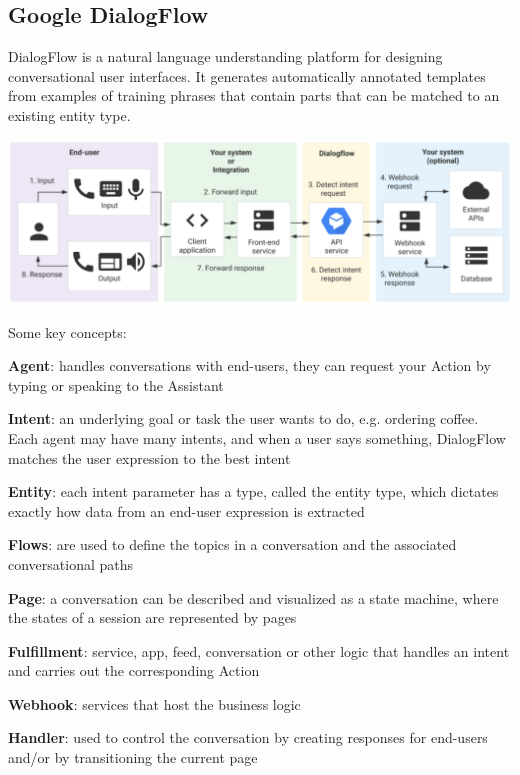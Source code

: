 \documentclass[10pt]{report}
\begin{document}
\subsection{Google DialogFlow} DialogFlow is a natural language understanding platform for designing conversational user interfaces. It generates automatically annotated templates from examples of training phrases that contain parts that can be matched to an existing entity type.
\begin{center}
	\includegraphics[scale=0.5]{138.png}
\end{center}
Some key concepts:
\begin{list}{}{}
	\item \textbf{Agent}: handles conversations with end-users, they can request your Action by typing or speaking to the Assistant
	\item \textbf{Intent}: an underlying goal or task the user wants to do, e.g. ordering coffee. Each agent may have many intents, and when a user says something, DialogFlow matches the user expression to the best intent
	\item \textbf{Entity}: each intent parameter has a type, called the entity type, which dictates exactly how data from an end-user expression is extracted
	\item \textbf{Flows}: are used to define the topics in a conversation and the associated conversational paths
	\item \textbf{Page}: a conversation can be described and visualized as a state machine, where the states of a session are represented by pages
	\item \textbf{Fulfillment}: service, app, feed, conversation or other logic that handles an intent and carries out the corresponding Action
	\item \textbf{Webhook}: services that host the business logic
	\item \textbf{Handler}: used to control the conversation by creating responses for end-users and/or by transitioning the current page
\end{list}
\pagebreak
\end{document}
